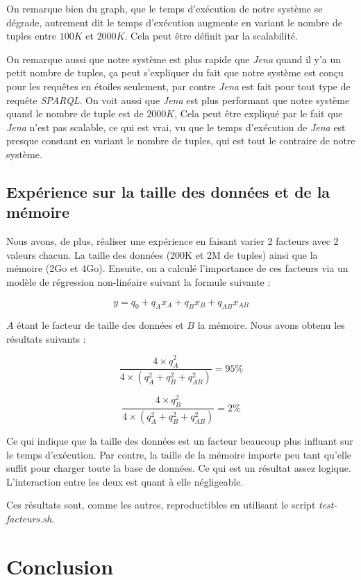 \documentclass[12pt,titlepage]{article}
\begin{document}
On remarque bien du graph, que le temps d'exécution de notre système se dégrade, autrement dit le temps d'exécution augmente en variant le nombre de tuples entre $100K$ et $2000K$. Cela peut être définit par la scalabilité. 

On remarque aussi que notre système est plus rapide que \textit{Jena} quand il y'a un petit nombre de tuples, ça peut s'expliquer du fait que notre système est conçu pour les requêtes en étoiles seulement, par contre \textit{Jena} est fait pour tout type de requête \textit{SPARQL}. On voit aussi que \textit{Jena} est plus performant que notre système quand le nombre de tuple est de $2000K$, Cela peut être expliqué par le fait que \textit{Jena} n'est pas scalable, ce qui est vrai, vu que le temps d'exécution de \textit{Jena} est presque constant en variant le nombre de tuples, qui est tout le contraire de notre système.

\subsection{Expérience sur la taille des données et de la mémoire}

Nous avons, de plus, réaliser une expérience en faisant varier 2 facteurs avec 2 valeurs chacun. La taille des données (200K et 2M de tuples) ainsi que la mémoire (2Go et 4Go). Ensuite, on a calculé l'importance de ces facteurs via un modèle de régression non-linéaire suivant la formule suivante :

\[
  y = q_0 + q_A x_A + q_B x_B + q_{AB} x_{AB}
\]

$A$ étant le facteur de taille des données et $B$ la mémoire. Nous avons obtenu les résultats suivants : 

\[
  \frac{4\times q_A^2}{4 \times  (q_A^2 + q_B^2 + q_{AB}^2)} = 95\%
\]

\[
  \frac{4\times q_B^2}{4 \times  (q_A^2 + q_B^2 + q_{AB}^2)} = 2\%
\]

Ce qui indique que la taille des données est un facteur beaucoup plus influant sur le temps d'exécution. Par contre, la taille de la mémoire importe peu tant qu'elle suffit pour charger toute la base de données. Ce qui est un résultat assez logique. L'interaction entre les deux est quant à elle négligeable.
 
Ces résultats sont, comme les autres, reproductibles en utilisant le script \textit{test-facteurs.sh}.

\section{Conclusion}
\end{document}
